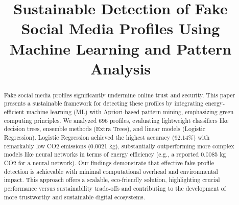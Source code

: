 \documentclass[conference]{IEEEtran}
\begin{document}
\title{Sustainable Detection of Fake Social Media Profiles Using Machine Learning and Pattern Analysis}

\author{
\and
{}
\and
{}
}

\maketitle

\begin{abstract}
Fake social media profiles significantly undermine online trust and security. This paper presents a sustainable framework for detecting these profiles by integrating energy-efficient machine learning (ML) with Apriori-based pattern mining, emphasizing green computing principles. We analyzed 696 profiles, evaluating lightweight classifiers like decision trees, ensemble methods (Extra Trees), and linear models (Logistic Regression). Logistic Regression achieved the highest accuracy (92.14\%) with remarkably low CO2 emissions (0.0021 kg), substantially outperforming more complex models like neural networks in terms of energy efficiency (e.g., a reported 0.0085 kg CO2 for a neural network). Our findings demonstrate that effective fake profile detection is achievable with minimal computational overhead and environmental impact. This approach offers a scalable, eco-friendly solution, highlighting crucial performance versus sustainability trade-offs and contributing to the development of more trustworthy and sustainable digital ecosystems.
\end{abstract}
\end{document}
